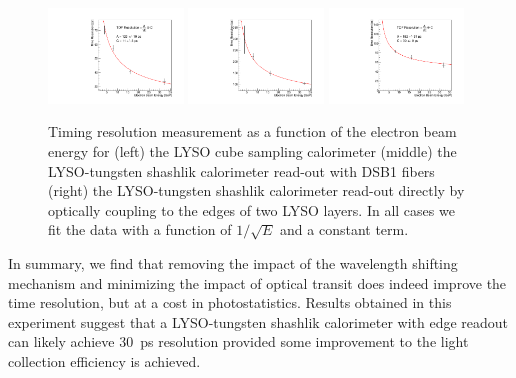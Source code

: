 \documentclass[12pt]{article}
\begin{document}
\begin{figure}[h] \centering

\caption{\small}
\label{fig:LYSOCubeTOFResolutionVsEnergy}
\end{figure}
\begin{figure}[H] \centering
\includegraphics[width=0.32\textwidth]{figs/TimeResolutionVsEnergy_CrystalCube} 
\includegraphics[width=0.32\textwidth]{figs/TimeResolutionVsEnergy_ShashlikDSB1Fiber} 
\includegraphics[width=0.32\textwidth]{figs/TimeResolutionVsEnergy_ShashlikSideReadout} 
\caption{ Timing resolution measurement as a function of the electron beam energy for (left) the LYSO cube
sampling calorimeter  
(middle) the LYSO-tungsten shashlik
calorimeter read-out with  DSB1 fibers %
(right)  the LYSO-tungsten shashlik calorimeter read-out directly by optically coupling to the edges of two LYSO layers. 
In all cases we fit the data with a function of $1/\sqrt{E}$  and a constant term. }
\label{fig:ShashlikSideReadoutTOFResolutionVsEnergy}
\end{figure}

In summary, we find that removing the impact of the wavelength shifting
mechanism and minimizing the impact of optical transit does indeed improve the
time resolution, but at a cost in photostatistics. Results obtained in this
experiment suggest that a LYSO-tungsten shashlik calorimeter with edge readout
can likely achieve $30$~ps resolution provided some improvement to the light
collection efficiency is achieved.
\end{document}
